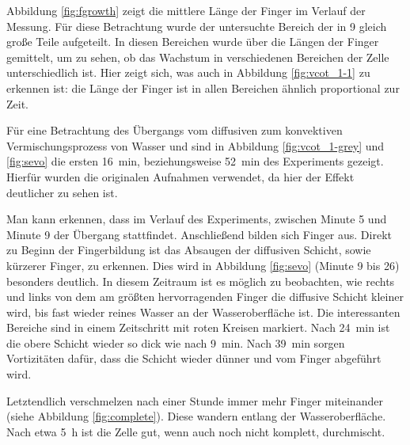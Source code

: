 
Abbildung \ref{fig:fgrowth} zeigt die mittlere Länge der Finger im Verlauf der Messung. Für diese Betrachtung wurde der untersuchte Bereich der \HSC in 9 gleich große Teile aufgeteilt. In diesen Bereichen wurde über die Längen der Finger gemittelt, um zu sehen, ob das Wachstum in verschiedenen Bereichen der Zelle unterschiedlich ist. 
Hier zeigt sich, was auch in Abbildung \ref{fig:vcot_1-1} zu erkennen ist: die Länge der Finger ist in allen Bereichen ähnlich proportional zur Zeit.

Für eine Betrachtung des Übergangs vom diffusiven zum konvektiven Vermischungsprozess von Wasser und \COT sind in Abbildung \ref{fig:vcot_1-grey} und \ref{fig:sevo} die ersten \SI{16}{\minute}, beziehungsweise \SI{52}{\minute} des Experiments gezeigt. Hierfür wurden die originalen Aufnahmen verwendet, da hier der Effekt deutlicher zu sehen ist.

Man kann erkennen, dass im Verlauf des Experiments, zwischen Minute 5 und Minute 9 der Übergang stattfindet. Anschließend bilden sich Finger aus. Direkt zu Beginn der Fingerbildung ist das Absaugen der diffusiven Schicht, sowie kürzerer Finger, zu erkennen. Dies wird in Abbildung \ref{fig:sevo} (Minute 9 bis 26) besonders deutlich. In diesem Zeitraum ist es möglich zu beobachten, wie rechts und links von dem am größten hervorragenden Finger die diffusive Schicht kleiner wird, bis fast wieder reines Wasser an der Wasseroberfläche ist. Die interessanten Bereiche sind in einem Zeitschritt mit roten Kreisen markiert. Nach \SI{24}{\minute} ist die obere \COT Schicht wieder so dick wie nach \SI{9}{\minute}. Nach \SI{39}{\minute} sorgen Vortizitäten dafür, dass die Schicht wieder dünner und vom Finger abgeführt wird.

Letztendlich verschmelzen nach einer Stunde immer mehr Finger miteinander (siehe \zB Abbildung \ref{fig:complete}). Diese wandern entlang der Wasseroberfläche.
Nach etwa \SI{5}{\hour} ist die Zelle gut, wenn auch noch nicht komplett, durchmischt.


